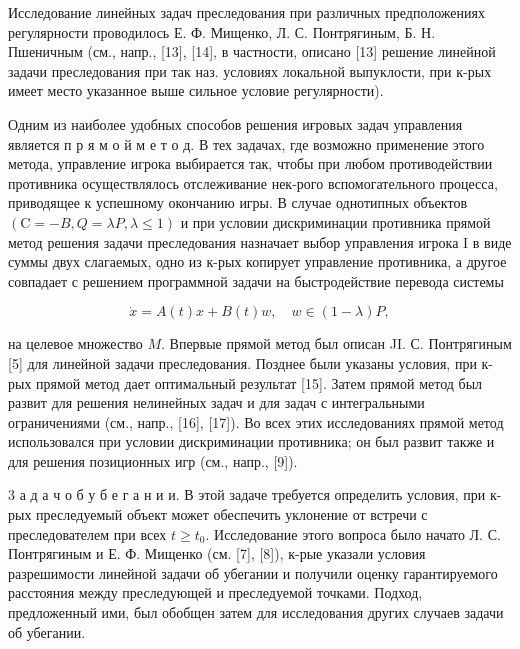 \documentclass[10pt]{article}
\begin{document}
Исследование линейных задач преследования при различных предположениях регулярности проводилось Е. Ф. Мищенко, Л. С. Понтрягиным, Б. Н. Пшеничным (см., напр., [13], [14], в частности, описано [13] решение линейной задачи преследования при так наз. условиях локальной выпуклости, при к-рых имеет место указанное выше сильное условие регулярности).



Одним из наиболее удобных способов решения иғровых задач управления является п р я м о й м е т о д. В тех задачах, где возможно применение этого метода, управление игрока выбирается так, чтобы при любом противодействии противника осуществлялось отслеживание нек-рого вспомогательного процесса, приводящее к успешному окончанию игры. В случае однотипных объектов $(\mathrm{C}=-B, Q=\lambda P, \lambda \leqslant 1)$ и при условии дискриминации противника прямой метод решения задачи преследования назначает выбор управления игрока I в виде суммы двух слагаемых, одно из к-рых копирует управление противника, а другое совпадает с решением программной задачи на быстродействие перевода системы



\[

\dot{x}=A(t) x+B(t) w, \quad w \in(1-\lambda) P,

\]



на целевое множество $M$. Впервые прямой метод был описан JI. С. Понтрягиным [5] для линейной задачи преследования. Позднее были указаны условия, при к-рых прямой метод дает оптимальный результат [15]. Затем прямой метод был развит для решения нелинейных задач и для задач с интегральными ограничениями (см., напр., [16], [17]). Во всех этих исследованиях прямой метод использовался при условии дискриминации противника; он был развит также и для решения позиционных игр (см., напр., [9]).



3 а д а ч о б у б е г а н и и. В этой задаче требуется определить условия, при к-рых преследуемый объект может обеспечить уклонение от встречи с преследователем при всех $t \geqslant t_{0}$. Исследование этого вопроса было начато Л. С. Понтрягиным и Е. Ф. Мищенко (см. [7], [8]), к-рые указали условия разрешимости линейной задачи об убегании и получили оценку гарантируемого расстояния между преследующей и преследуемой точками. Подход, предложенный ими, был обобщен затем для исследования других случаев задачи об убегании.
\end{document}
